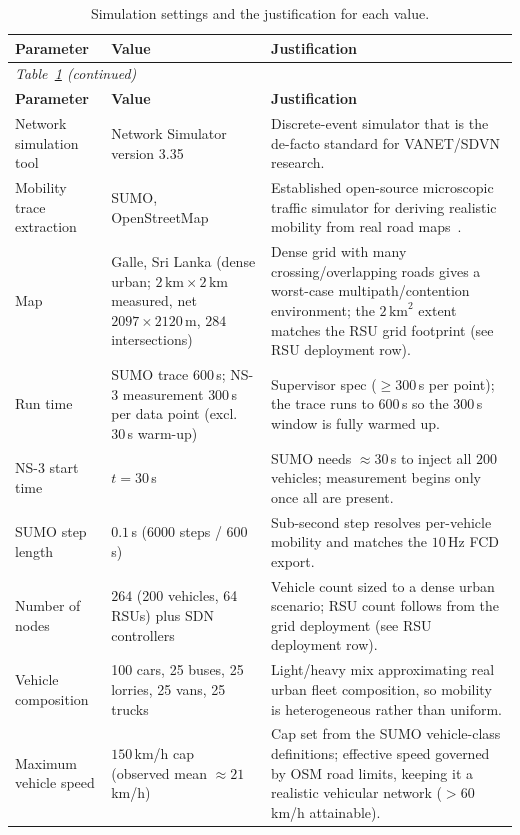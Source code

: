 \documentclass[12pt, a4paper]{report}
\begin{document}
{\small
\setlength{\LTleft}{0pt}\setlength{\LTright}{\fill}
\begin{longtable}{| p{3.0cm} | p{4.3cm} | p{6.0cm} |}
\caption{Simulation settings and the justification for each value.}
\label{tab:sim_settings}\\
\hline
\textbf{Parameter} & \textbf{Value} & \textbf{Justification} \\
\hline
\endfirsthead
\multicolumn{3}{l}{\itshape Table~\ref{tab:sim_settings} (continued)}\\
\hline
\textbf{Parameter} & \textbf{Value} & \textbf{Justification} \\
\hline
\endhead
\hline
\endfoot
\hline
\endlastfoot
Network simulation tool & Network Simulator version 3.35 & Discrete-event simulator that is the de-facto standard for VANET/SDVN research. \\
\hline
Mobility trace extraction & SUMO, OpenStreetMap & Established open-source microscopic traffic simulator for deriving realistic mobility from real road maps~\cite{rathod2017survey}. \\
\hline
Map & Galle, Sri Lanka (dense urban; $2\,\text{km}\times2\,\text{km}$ measured, net $2097\times2120$\,m, $284$ intersections) & Dense grid with many crossing/overlapping roads gives a worst-case multipath/contention environment; the $2\,\text{km}^2$ extent matches the RSU grid footprint (see RSU deployment row). \\
\hline
Run time & SUMO trace $600$\,s; NS-3 measurement $300$\,s per data point (excl.\ $30$\,s warm-up) & Supervisor spec ($\geq300$\,s per point); the trace runs to $600$\,s so the $300$\,s window is fully warmed up. \\
\hline
NS-3 start time & $t=30$\,s & SUMO needs $\approx30$\,s to inject all $200$ vehicles; measurement begins only once all are present. \\
\hline
SUMO step length & $0.1$\,s ($6000$ steps / $600$\,s) & Sub-second step resolves per-vehicle mobility and matches the $10$\,Hz FCD export. \\
\hline
Number of nodes & $264$ (200 vehicles, 64 RSUs) plus SDN controllers & Vehicle count sized to a dense urban scenario; RSU count follows from the grid deployment (see RSU deployment row). \\
\hline
Vehicle composition & 100 cars, 25 buses, 25 lorries, 25 vans, 25 trucks & Light/heavy mix approximating real urban fleet composition, so mobility is heterogeneous rather than uniform. \\
\hline
Maximum vehicle speed & $150$\,km/h cap (observed mean $\approx21$\,km/h) & Cap set from the SUMO vehicle-class definitions; effective speed governed by OSM road limits, keeping it a realistic vehicular network ($>60$\,km/h attainable). \\

\end{longtable}}
\end{document}
